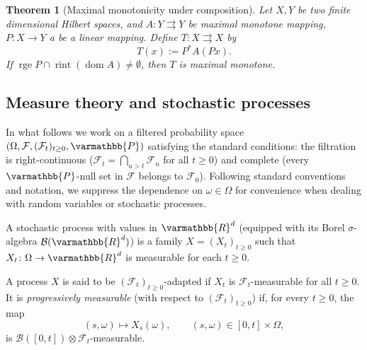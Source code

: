 \documentclass[11pt,reqno]{article}
\let\mathbb=\varmathbb
\newcommand{\tto}{\rightrightarrows}
\newcommand{\dom}{\operatorname{dom}}
\newcommand{\1}{\mathds{1}}
\numberwithin{equation}{section}  %
\theoremstyle{plain}
\newtheorem{theorem}{Theorem}
\theoremstyle{definition}
\theoremstyle{remark}
\numberwithin{theorem}{section}
\numberwithin{remark}{section}
\numberwithin{example}{section}
\begin{document}
\begin{theorem}[Maximal monotonicity under composition]\label{thm:max_mono_comp}
Let $X,Y$ be two finite dimensional Hilbert spaces, and $A \colon  Y \rightrightarrows Y$ be  maximal monotone mapping, $P \colon  X \to Y$ a be a linear mapping. Define $T \colon  X \tto X$ by 
\[
  T(x) := P^{\ast} A(Px).
\]
If $  \operatorname{rge} P \cap \operatorname{rint} \left(  \dom A  \right)  \neq \emptyset$, then $T$ is maximal monotone.
\end{theorem}

\subsection{Measure theory and stochastic processes}
In what follows we work on a filtered probability space 
$(\Omega,\mathcal{F},(\mathcal{F}_t)_{t\ge 0},\mathbb{P})$ 
satisfying the standard conditions: the filtration is right-continuous 
($\mathcal{F}_t=\bigcap_{u>t}\mathcal{F}_u$ for all $t\ge 0$) and complete 
(every $\mathbb{P}$-null set in $\mathcal{F}$ belongs to $\mathcal{F}_0$). Following standard conventions and notation, we suppress the dependence on  
$\omega \in \Omega$ for convenience when dealing with random variables or 
stochastic processes. %

A stochastic process with values in $\mathbb{R}^d$ (equipped with its Borel 
$\sigma$-algebra $\mathcal{B}(\mathbb{R}^d)$) is a family $X=(X_t)_{t\ge 0}$ such that 
$X_t\colon \Omega\to \mathbb{R}^d$ is measurable for each $t\ge 0$.

A process $X$ is said to be $(\mathcal{F}_t)_{t\ge 0}$-adapted if $X_t$ is 
$\mathcal{F}_t$-measurable for all $t\ge 0$. 
It is \emph{progressively measurable} (with respect to $(\mathcal{F}_t)_{t\ge 0}$) if, 
for every $t\ge 0$, the map 
\[
   (s,\omega)\mapsto X_s(\omega), \qquad (s,\omega)\in [0,t]\times\Omega,
\] 
is $\mathcal{B}([0,t])\otimes\mathcal{F}_t$-measurable.
\end{document}
